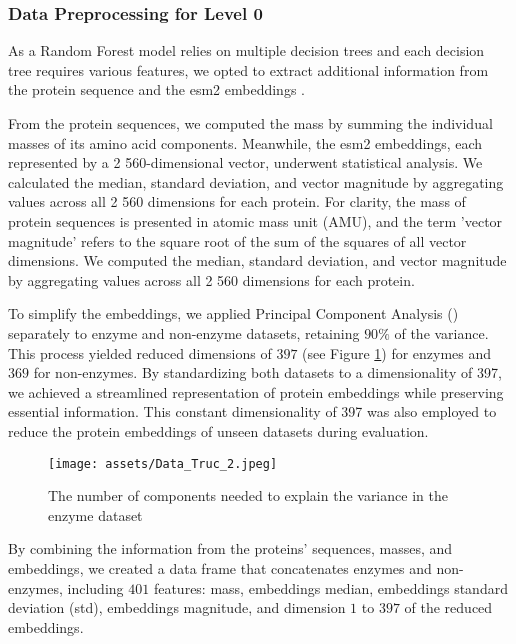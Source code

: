 \documentclass{bioinfo}
\begin{document}
\begin{methods}
\subsubsection{Data Preprocessing for Level 0}
As a Random Forest model relies on multiple decision trees and each
decision tree requires various features, we opted to extract additional
information from the protein sequence and the esm2 embeddings \cite{ESM2}.

From the protein sequences, we computed the mass by summing the individual masses of its amino acid components. 
Meanwhile, the esm2 embeddings, each represented by a 2 560-dimensional vector, underwent statistical analysis.
We calculated the median, standard deviation, and vector magnitude by aggregating values across all 2 560 dimensions for each protein.
For clarity, the mass of protein sequences is presented in atomic mass unit (AMU),
and the term 'vector magnitude' refers to the square root of the sum of the squares of all vector dimensions.
We computed the median, standard deviation, and vector magnitude by aggregating values across all 2 560 dimensions for each protein.

To simplify the embeddings, we applied Principal Component Analysis (\cite{scikit-learn})
separately to enzyme and non-enzyme datasets,
retaining $90\%$ of the variance. This process yielded reduced dimensions of $397$ (see Figure \ref{fig:PCA_enzymes}) for enzymes and $369$ for non-enzymes. 
By standardizing both datasets to a dimensionality of 397, we achieved a streamlined representation of protein embeddings while preserving essential information.
This constant dimensionality of 397 was also employed to reduce the protein embeddings of unseen datasets during evaluation.

\begin{figure}[!tbp]
\texttt{[image: assets/Data\_Truc\_2.jpeg]}
\caption{The number of components needed to explain the variance in the enzyme dataset}\label{fig:PCA_enzymes}
\end{figure}



By combining the information from the proteins’ sequences, masses, and embeddings, we created a data frame that concatenates enzymes and non-enzymes,
including $401$ features: mass, embeddings median, embeddings standard deviation (std), embeddings magnitude, and dimension $1$ to $397$ of the reduced 
embeddings. 


\end{methods}
\end{document}
